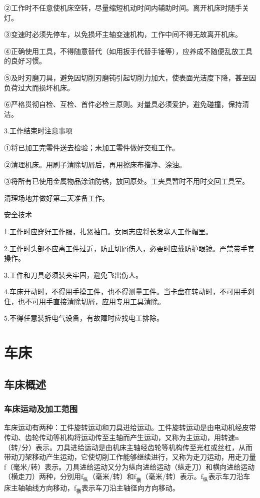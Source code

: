 \documentclass{ctexbook}
\begin{document}
②工作时不任意使机床空转，尽量缩短机动时间内辅助时间。离开机床时随手关灯。

③变速时必须先停车，以免损坏主轴变速机构，工作中间不得无故离开机床。

④正确使用工具，不得随意替代（如用扳手代替手锤等），应养成不随便乱放工具的良好习惯。

⑤及时刃磨刀具，避免因切削刃磨钝引起切削力加大，使表面光洁度下降，甚至因负荷过大而损坏机床。

⑥严格贯彻自检、互检、首件必检三原则。对量具必须爱护，避免碰撞，保持清洁。

3.工作结束时注意事项

①将已加工完零件送去检验；未加工零件做好交班工作。

②清理机床。用刷子清除切屑后，再用擦床布揩净、涂油。

③将所有已使用金属物品涂油防锈，放回原处。工夹具暂时不用时交回工具室。

清理场地并做好第二天准备工作。

安全技术

1.工作时应穿好工作服，扎紧袖口。女同志应将长发塞入工作帽里。

2.工作时头部不应离工件过近，防止切屑伤人，必要时应戴防护眼镜。严禁带手套操作。

3.工件和刀具必须装夹牢固，避免飞出伤人。

4.车床开动时，不得用手摸工件，也不得测量工件。当卡盘在转动时，不可用手刹住，也不可用手直接清除切屑，应用专用工具清除。

5.不得任意装拆电气设备，有故障时应找电工排除。
\section{车床}
\subsection{车床概述}
\subsubsection{车床运动及加工范围}

车床运动有两种：工件旋转运动和刀具进给运动。工件旋转运动是由电动机经皮带传动、齿轮传动等机构将运动传至主轴而产生运动，又称为主运动，用转速n（转/分）表示。刀具进给运动是由机床主轴经齿轮等机构传至光杠或丝杠，从而带动刀架移动产生运动，它使切削工作能够继续进行，又称为走刀运动，用走刀量f（毫米/转）表示。刀具进给运动又分为纵向进给运动（纵走刀）和横向进给运动（横走刀）两种，分别用f$_{\text{纵}}$（毫米/转）和f$_{\text{横}}$（毫米/转）表示。f$_{\text{纵}}$表示车刀沿车床主轴轴线方向移动，f$_{\text{横}}$表示车刀沿主轴径向方向移动。
\end{document}
